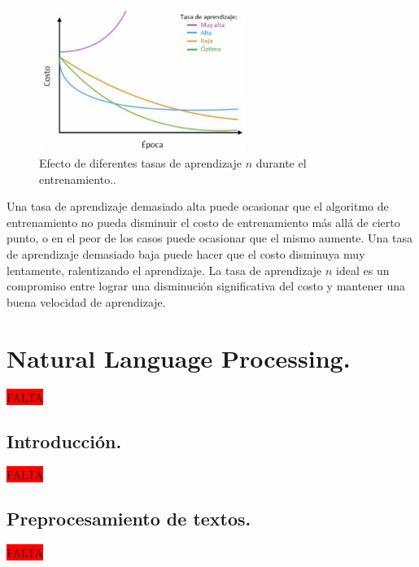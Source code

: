\documentclass[12pt,a4paper]{article}
\begin{document}
\begin{sloppypar}
\begin{figure}[H]    %
 \centering
 \includegraphics[width=0.6\textwidth]{images/ANN/6-ANN.png}
  \captionsetup{justification=centering,margin=3cm}
 \caption{Efecto de diferentes tasas de aprendizaje $n$ durante el entrenamiento.\cite{ANN_25}.} 
 \label{fig:ann_6}
\end{figure}

Una tasa de aprendizaje demasiado alta puede ocasionar que el algoritmo de entrenamiento no pueda disminuir el costo de entrenamiento más allá de cierto punto, o en el peor de los casos puede ocasionar que el mismo aumente. Una tasa de aprendizaje demasiado baja puede hacer que el costo disminuya muy lentamente, ralentizando el aprendizaje. La tasa de aprendizaje $n$ ideal es un compromiso entre lograr una disminución significativa del costo y mantener una buena velocidad de aprendizaje\cite{ANN_25}.






\cleardoublepage
\section{Natural Language Processing.}\label{4.NaturalLanguageProcessing}

\colorbox{red}{FALTA}

\cleardoublepage

\subsection{Introducción.}
\colorbox{red}{FALTA}

\cleardoublepage

\subsection{Preprocesamiento de textos.}
\colorbox{red}{FALTA}


\end{sloppypar}
\end{document}

